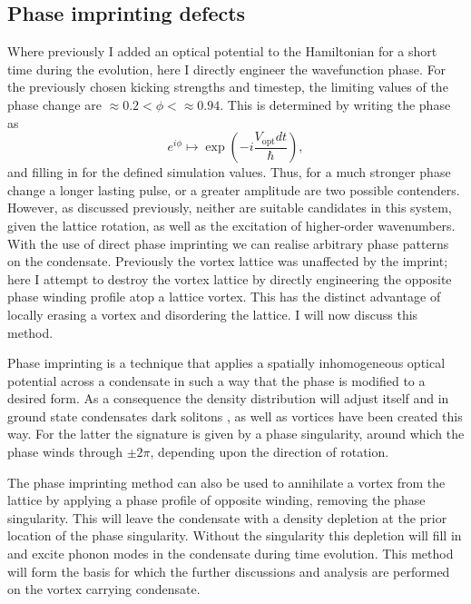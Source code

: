 \subsection{Phase imprinting defects}\label{sec:phase}

Where previously I added an optical potential to the Hamiltonian for a short time during the evolution, here I directly engineer the wavefunction phase. For the previously chosen kicking strengths and timestep, the limiting values of the phase change are $\approx 0.2 < \phi < \approx 0.94$. This is determined by writing the phase as
\begin{equation}
    e^{i\phi} \mapsto \exp\left(-i\frac{V_{\textrm{opt}}dt}{\hbar}\right),
\end{equation}
and filling in for the defined simulation values. Thus, for a much stronger phase change a longer lasting pulse, or a greater amplitude are two possible contenders. However, as discussed previously, neither are suitable candidates in this system, given the lattice rotation, as well as the excitation of higher-order wavenumbers. With the use of direct phase imprinting we can realise arbitrary phase patterns on the condensate. Previously the vortex lattice was unaffected by the imprint; here I attempt to destroy the vortex lattice by directly engineering the opposite phase winding profile atop a lattice vortex. This has the distinct advantage of locally erasing a vortex and disordering the lattice. I will now discuss this method.

Phase imprinting is a technique that applies a spatially inhomogeneous optical potential across a condensate in such a way that the phase is modified to a desired form. As a consequence the density distribution will adjust itself and in ground state condensates dark solitons \cite{BEC:Denschlag_science_2000}, as well as vortices \cite{Vtx:Dobrek_pra_1999} have been created this way. For the latter the signature is given by a phase singularity, around which the phase winds through $\pm 2\pi$, depending upon the direction of rotation.

The phase imprinting method can also be used to annihilate a vortex from the lattice by applying a phase profile of opposite winding, removing the phase singularity.  This will leave the condensate with a density depletion at the prior location of the phase singularity. Without the singularity this depletion will fill in and excite phonon modes in the condensate during time evolution. This method will form the basis for which the further discussions and analysis are performed on the vortex carrying condensate.






